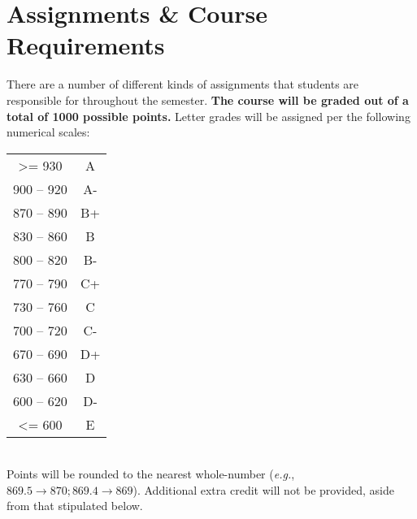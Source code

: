 \documentclass[11pt]{article}
\begin{document}
\section{Assignments \& Course Requirements}
There are a number of different kinds of assignments that students are responsible for throughout the semester. \textbf{The course will be graded out of a total of 1000 possible points.} Letter grades will be assigned per the following numerical scales:\vspace{5mm}\\\vspace{5mm}
\hspace*{40mm}
\begin{tabular}{ c c}
\textgreater= 930 & A  \\
900 -- 920 & A- \\
870 -- 890 & B+ \\
830 -- 860 & B \\
800 -- 820 & B- \\
770 -- 790 & C+ \\
730 -- 760 & C \\
700 -- 720 & C- \\
670 -- 690 & D+ \\
630 -- 660 & D \\
600 -- 620 & D- \\
\textless= 600 & E \\
\end{tabular}\\
Points will be rounded to the nearest whole-number (\textit{e.g.}, $869.5 \rightarrow 870; 869.4 \rightarrow 869$). Additional extra credit will not be provided, aside from that stipulated below.
\end{document}
